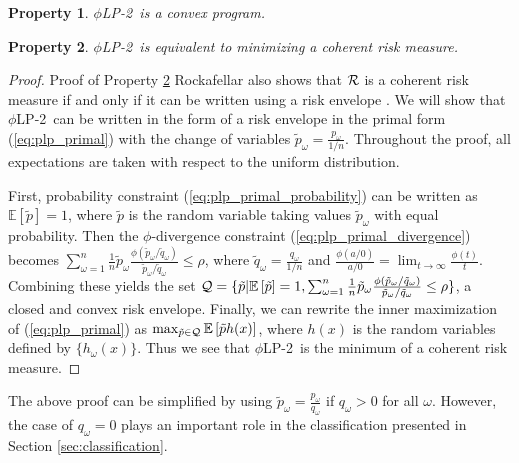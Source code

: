 \documentclass[opre,nonblindrev]{informs3} %
\newcommand{\E}{\mathbb{E}}
\newcommand{\e}[1]{\E \left[ #1 \right]}
\newtheorem{property}{Property}
\newcommand{\plp}{$\phi$LP-2}
\begin{document}
\begin{property}
	\label{property:convex}
	\plp\ is a convex program.
\end{property}

\begin{property}
	\label{property:coherent_risk_measure}
	\plp\ is equivalent to minimizing a coherent risk measure.
\end{property}

\begin{proof}{\sc Proof of Property \ref{property:coherent_risk_measure}}
	Rockafellar also shows that $\cal R$ is a coherent risk measure if and only if it can be written using a risk envelope \cite{rockafellar2007coherent}.
	We will show that \plp\ can be written in the form of a risk envelope in the primal form (\ref{eq:plp_primal}) with the change of variables $\tilde{p}_\omega = \frac{p_\omega}{1/n}$.
	Throughout the proof, all expectations are taken with respect to the uniform distribution.
	
	First, probability constraint (\ref{eq:plp_primal_probability}) can be written as $\e{\tilde{p}} = 1$, where $\tilde{p}$ is the random variable taking values $\tilde{p}_\omega$ with equal probability.
	Then the $\phi$-divergence constraint (\ref{eq:plp_primal_divergence}) becomes $\sum_{\omega=1}^n \frac{1}{n} \tilde{p}_\omega \frac{\phi\left(\tilde{p}_\omega/\tilde{q}_\omega\right)}{\tilde{p}_\omega/\tilde{q}_\omega} \leq \rho$, where $\tilde{q}_\omega = \frac{q_\omega}{1/n}$ and $\frac{\phi(a/0)}{a/0} = \lim_{t \rightarrow \infty} \frac{\phi(t)}{t}$.
	Combining these yields the set ${\cal Q} = \{\tilde{p} | \e{\tilde{p}} = 1, \sum_{\omega=1}^n \frac{1}{n} \tilde{p}_\omega \frac{\phi\left(\tilde{p}_\omega/\tilde{q}_\omega\right)}{\tilde{p}_\omega/\tilde{q}_\omega} \leq \rho \}$, a closed and convex risk envelope.
	Finally, we can rewrite the inner maximization of (\ref{eq:plp_primal}) as $\max_{\tilde{p} \in {\cal Q}} \e{\tilde{p} h(x)}$, where $h(x)$ is the random variables defined by $\{h_\omega(x)\}$.
	Thus we see that \plp\ is the minimum of a coherent risk measure.
\end{proof}

\begin{remark}
	The above proof can be simplified by using $\tilde{p}_\omega = \frac{p_\omega}{q_\omega}$ if $q_\omega > 0$ for all $\omega$.
	However, the case of $q_\omega = 0$ plays an important role in the classification presented in Section \ref{sec:classification}.
\end{remark}
\end{document}
